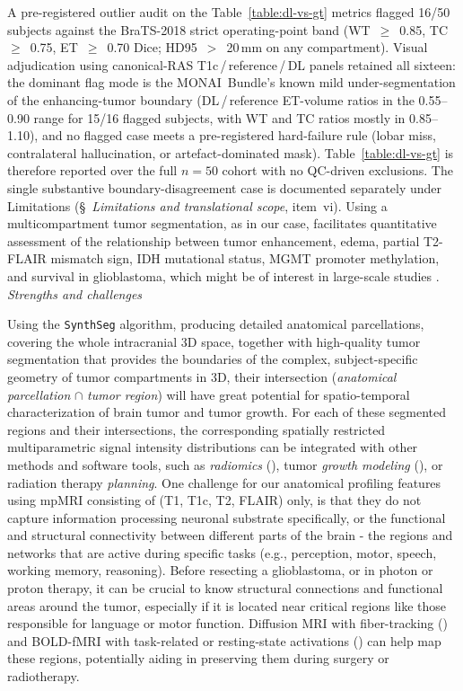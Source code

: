 \documentclass[a4paper,11pt,leqno]{article}
\begin{document}
A pre-registered outlier audit on the
Table~\ref{table:dl-vs-gt} metrics flagged 16/50 subjects against
the BraTS-2018 strict operating-point band
(WT~$\geq$~0.85, TC~$\geq$~0.75, ET~$\geq$~0.70 Dice; HD95~$>$~20\,mm
on any compartment). Visual adjudication using canonical-RAS
T1c\,/\,reference\,/\,DL panels retained all sixteen: the
dominant flag mode is the MONAI~Bundle's known mild under-segmentation
of the enhancing-tumor boundary (DL\,/\,reference ET-volume ratios in
the 0.55--0.90 range for 15/16 flagged subjects, with WT and TC ratios
mostly in 0.85--1.10), and no flagged case meets a pre-registered
hard-failure rule (lobar miss, contralateral hallucination, or
artefact-dominated mask). Table~\ref{table:dl-vs-gt} is therefore reported over the full $n=50$
cohort with no QC-driven exclusions. The single substantive boundary-disagreement case is documented separately under
Limitations (\S~\emph{Limitations and translational scope}, item~vi).
Using a multicompartment tumor segmentation, as in our case,
facilitates quantitative assessment of the relationship between tumor
enhancement, edema, partial T2-FLAIR mismatch sign, IDH mutational
status, MGMT promoter methylation, and survival in glioblastoma, which
might be of interest in large-scale studies
\cite{Carrillo2012, Lee2023, Pope2005}.\\



\noindent \emph{Strengths and challenges}

\vspace{2mm}

Using the \texttt{SynthSeg} algorithm, producing detailed anatomical parcellations,
covering the whole intracranial 3D space, together with high-quality tumor
segmentation that provides the boundaries of the complex, subject-specific geometry of tumor compartments in 3D, their intersection (\textit{anatomical parcellation} $\cap$ \textit{tumor region})  will have great potential for spatio-temporal
characterization of brain tumor and tumor growth. For each of these
segmented regions and their intersections, the corresponding
spatially restricted multiparametric signal intensity distributions can
be integrated with other methods and software tools, such as
\emph{radiomics} (\cite{Hooper2023}), tumor \emph{growth modeling} (\cite{Mang2020}), or radiation therapy
\emph{planning}.
One challenge for our anatomical profiling features
using mpMRI consisting of (T1, T1c, T2,
FLAIR) only, is that they do not capture information processing neuronal substrate specifically, or the
functional and structural connectivity between different parts of the
brain - the regions and networks that are active during
specific tasks (e.g., perception, motor, speech, working memory,
reasoning). Before resecting a glioblastoma, or in photon or proton therapy, it can be crucial to know
structural connections  and functional areas around the tumor,
especially if it is located near critical regions like those responsible
for language or motor function. Diffusion MRI with fiber-tracking (\cite{Witulla2020}) and
BOLD-fMRI with task-related or resting-state activations (\cite{Nieberlein2023}) can help map
these regions, potentially aiding in preserving them during surgery or radiotherapy.
\end{document}
